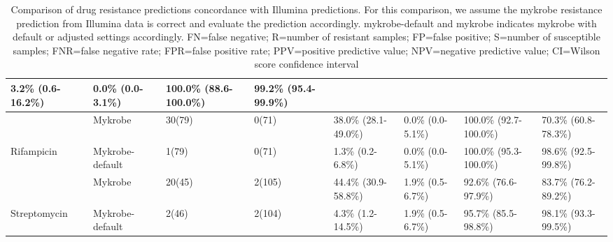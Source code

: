 \begin{table}
{\begin{tabular}{|l|l|l|l|l|l|l|l|}
  \cellcolor[HTML]{EFEFEF}3.2\% (0.6-16.2\%) &
  \cellcolor[HTML]{EFEFEF}0.0\% (0.0-3.1\%) &
  \cellcolor[HTML]{EFEFEF}100.0\% (88.6-100.0\%) &
  \cellcolor[HTML]{EFEFEF}99.2\% (95.4-99.9\%) \\ \hline
 &
  Mykrobe &
  30(79) &
  0(71) &
  38.0\% (28.1-49.0\%) &
  0.0\% (0.0-5.1\%) &
  100.0\% (92.7-100.0\%) &
  70.3\% (60.8-78.3\%) \\ \cline{2-8} 
\multirow{-2}{*}{Rifampicin} &
  \cellcolor[HTML]{EFEFEF}Mykrobe-default &
  \cellcolor[HTML]{EFEFEF}1(79) &
  \cellcolor[HTML]{EFEFEF}0(71) &
  \cellcolor[HTML]{EFEFEF}1.3\% (0.2-6.8\%) &
  \cellcolor[HTML]{EFEFEF}0.0\% (0.0-5.1\%) &
  \cellcolor[HTML]{EFEFEF}100.0\% (95.3-100.0\%) &
  \cellcolor[HTML]{EFEFEF}98.6\% (92.5-99.8\%) \\ \hline
 &
  Mykrobe &
  20(45) &
  2(105) &
  44.4\% (30.9-58.8\%) &
  1.9\% (0.5-6.7\%) &
  92.6\% (76.6-97.9\%) &
  83.7\% (76.2-89.2\%) \\ \cline{2-8} 
\multirow{-2}{*}{Streptomycin} &
  \cellcolor[HTML]{EFEFEF}Mykrobe-default &
  \cellcolor[HTML]{EFEFEF}2(46) &
  \cellcolor[HTML]{EFEFEF}2(104) &
  \cellcolor[HTML]{EFEFEF}4.3\% (1.2-14.5\%) &
  \cellcolor[HTML]{EFEFEF}1.9\% (0.5-6.7\%) &
  \cellcolor[HTML]{EFEFEF}95.7\% (85.5-98.8\%) &
  \cellcolor[HTML]{EFEFEF}98.1\% (93.3-99.5\%) \\ \hline
\end{tabular}%
}
\caption{Comparison of \ont{} drug resistance predictions concordance with Illumina predictions. For this comparison, we assume the mykrobe resistance prediction from Illumina data is correct and evaluate the \ont{} prediction accordingly. mykrobe-default and mykrobe indicates mykrobe with default or adjusted settings accordingly. FN=false negative; R=number of resistant samples; FP=false positive; S=number of susceptible samples; FNR=false negative rate; FPR=false positive rate; PPV=positive predictive value; NPV=negative predictive value; CI=Wilson score confidence interval}
\label{tab:mykrobe-settings-geno}
\end{table}
